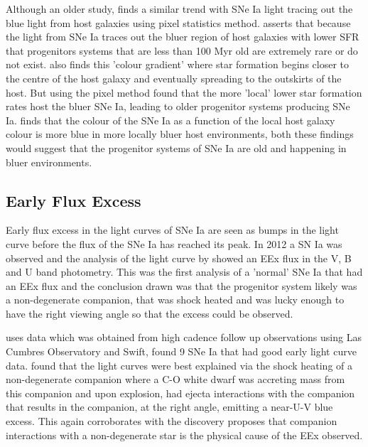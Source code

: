 Although an older study, \textcite{anderson_environments_2015} finds a similar trend with SNe Ia light tracing out the blue light from host galaxies using pixel statistics method. \textcite{anderson_environments_2015} asserts that because the light from SNe Ia traces out the bluer region of host galaxies with lower SFR that progenitors systems that are less than 100 Myr old are extremely rare or do not exist. \textcite{kelsey_concerning_2022} also finds this 'colour gradient' where star formation begins closer to the centre of the host galaxy and eventually spreading to the outskirts of the host. But \textcite{anderson_environments_2015} using the pixel method found that the more 'local' lower star formation rates host the bluer SNe Ia, leading to older progenitor systems producing SNe Ia. \textcite{kelsey_concerning_2022} finds that the colour of the SNe Ia as a function of the local host galaxy colour is more blue in more locally bluer host environments, both these findings would suggest that the progenitor systems of SNe Ia are old and happening in bluer environments.   

\subsection{Early Flux Excess} \label{subsec: Early Flux Excess}
Early flux excess in the light curves of SNe Ia are seen as bumps in the light curve before the flux of the SNe Ia has reached its peak. In 2012 a SN Ia was observed and the analysis of the light curve by \textcite{marion_sn2012cg_2016} showed an EEx flux in the V, B and U band photometry. This was the first analysis of a 'normal' SNe Ia that had an EEx flux and the conclusion drawn was that the progenitor system likely was a non-degenerate companion, that was shock heated and was lucky enough to have the right viewing angle so that the excess could be observed. 

\textcite{burke_early_2022} uses data which was obtained from high cadence follow up observations using Las Cumbres Observatory and Swift, found 9 SNe Ia that had good early light curve data. \textcite{burke_early_2022} found that the light curves were best explained via the shock heating of a non-degenerate companion where a C-O white dwarf was accreting mass from this companion and upon explosion, had ejecta interactions with the companion that results in the companion, at the right angle, emitting a near-U-V blue excess. This again corroborates with the discovery \textcite{marion_sn2012cg_2016} proposes that companion interactions with a non-degenerate star is the physical cause of the EEx observed.

